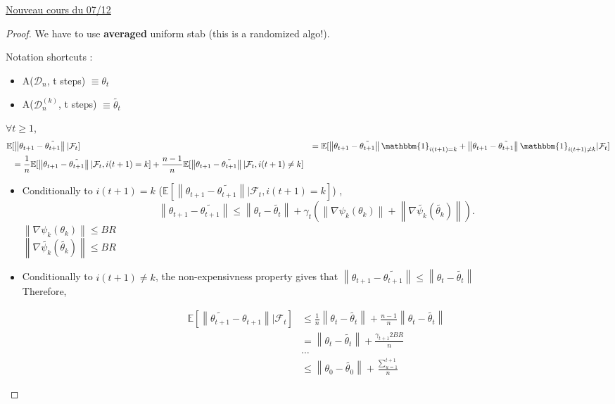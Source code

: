 \underline{Nouveau cours du 07/12} \\

\begin{proof}
    We have to use \textbf{averaged} uniform stab (this is a randomized algo!).
    
    Notation shortcuts : \begin{itemize}
        \item A($\mathcal{D}_n$, t steps) $\equiv \theta_t$
        \item A($\mathcal{D}_n^{(k)}$, t steps) $\equiv \tilde{\theta_t}$
    \end{itemize}
    
    $\forall t \geq 1$,
    \begin{align*}
        \mathbb{E} 
            & [ \left\| \theta_{t+1} - \tilde{\theta_{t+1}} \right\| | \mathcal{F}_t ]
            & = \mathbb{E}[ \left\| \theta_{t+1} - \tilde{\theta_{t+1}} \right\| \mathbbm{1}_{i(t+1)= k} + \left\| \theta_{t+1} - \tilde{\theta_{t+1}} \right\| \mathbbm{1}_{i(t+1)\neq  k}| \mathcal{F}_t] \\
            & = \frac{1}{n} \mathbb{E}[ \left\| \theta_{t+1} - \tilde{\theta_{t+1}} \right\| | \mathcal{F}_t, i(t+1)= k] + \frac{n-1}{n} \mathbb{E}[ \left\| \theta_{t+1} - \tilde{\theta_{t+1}} \right\| | \mathcal{F}_t, i(t+1) \neq k]
    \end{align*}
    
    \begin{itemize}
        \item Conditionally to $i(t+1) = k$ ($\mathbb{E}[ \left\| \theta_{t+1} - \tilde{\theta_{t+1}} \right\| | \mathcal{F}_t, i(t+1)= k]$) , 
        \[
            \left\| \theta_{t+1} - \tilde{\theta_{t+1}} \right\| \leq \left\| \theta_{t} - \tilde{\theta_{t}} \right\| + \gamma _t ( \left\| \nabla \psi_k (\theta _k) \right\| + \left\| \nabla \tilde{\psi_k} (\tilde{\theta _k}) \right\|)
        .\]
        $\left\| \nabla \psi_k (\theta _k) \right\| \leq BR$ \\
        $\left\| \nabla \tilde{\psi_k} (\tilde{\theta _k}) \right\| \leq BR$

        \item Conditionally to $i(t+1) \neq  k$, the non-expensivness property gives that $\left\|  \theta_{t+1} - \tilde{\theta_{t+1}} \right\| \leq \left\|  \theta_{t} - \tilde{\theta_{t}} \right\|$ \\
        Therefore,
        
        \begin{align*}
            \mathbb{E}[ \left\| \tilde{\theta_{t+1}} - \theta_{t+1} \right\| | \mathcal{F}_t] &\leq \frac{1}{n} \left\| \theta_{t} - \tilde{\theta_{t}} \right\| + \frac{n-1}{n} \left\| \theta_{t} - \tilde{\theta_{t}} \right\| \\
            & = \left\| \theta_{t} - \tilde{\theta_{t}} \right\| + \frac{\gamma _ {t+1} 2BR}{n} \\
            & \dots \\
            & \leq \left\| \theta_0 - \tilde{\theta _0} \right\|  + \frac{\sum_{u=1}^{t+1}}{n}
        \end{align*}


\end{itemize}
\end{proof}
